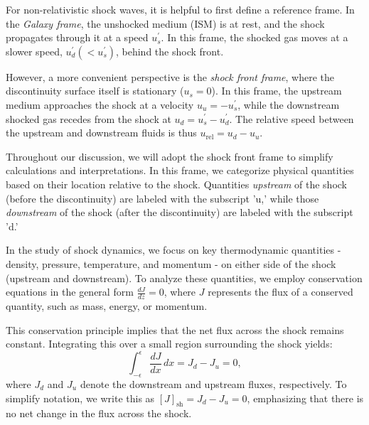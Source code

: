 For non-relativistic shock waves, it is helpful to first define a reference frame. In the \emph{Galaxy frame}, the unshocked medium (ISM) is at rest, and the shock propagates through it at a speed \( u^\prime_s \). In this frame, the shocked gas moves at a slower speed, \( u^\prime_d (< u^\prime_s) \), behind the shock front.

However, a more convenient perspective is the \emph{shock front frame}, where the discontinuity surface itself is stationary (\( u_s = 0 \)). In this frame, the upstream medium approaches the shock at a velocity \( u_u = -u^\prime_s \), while the downstream shocked gas recedes from the shock at \( u_d = u^\prime_s - u^\prime_d \). The relative speed between the upstream and downstream fluids is thus \( u_{\text{rel}} = u_d - u_u \). 

Throughout our discussion, we will adopt the shock front frame to simplify calculations and interpretations. In this frame, we categorize physical quantities based on their location relative to the shock. Quantities \emph{upstream} of the shock (before the discontinuity) are labeled with the subscript 'u,' while those \emph{downstream} of the shock (after the discontinuity) are labeled with the subscript 'd.'

In the study of shock dynamics, we focus on key thermodynamic quantities - density, pressure, temperature, and momentum - on either side of the shock (upstream and downstream). To analyze these quantities, we employ conservation equations in the general form \( \frac{dJ}{dz} = 0 \), where \( J \) represents the flux of a conserved quantity, such as mass, energy, or momentum.

This conservation principle implies that the net flux across the shock remains constant. Integrating this over a small region surrounding the shock yields:
%
\[
\int_{-\epsilon}^{\epsilon} \frac{dJ}{dx} \, dx = J_d - J_u = 0,
\]
%
where \( J_d \) and \( J_u \) denote the downstream and upstream fluxes, respectively. To simplify notation, we write this as \( [J]_{\text{sh}} = J_d - J_u = 0 \), emphasizing that there is no net change in the flux across the shock.

